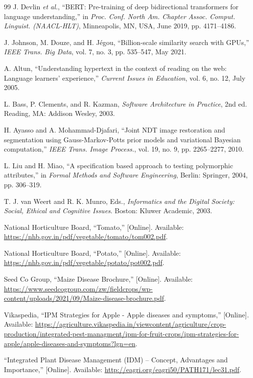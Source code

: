 \documentclass[12pt, a4paper]{report}
\begin{document}
\begin{thebibliography}{99}
J. Devlin \textit{et al.}, ``BERT: Pre-training of deep bidirectional transformers for language understanding,'' in \textit{Proc. Conf. North Am. Chapter Assoc. Comput. Linguist. (NAACL-HLT)}, Minneapolis, MN, USA, June 2019, pp. 4171--4186.

J. Johnson, M. Douze, and H. Jégou, ``Billion-scale similarity search with GPUs,'' \textit{IEEE Trans. Big Data}, vol. 7, no. 3, pp. 535--547, May 2021.

A. Altun, ``Understanding hypertext in the context of reading on the web: Language learners' experience,'' \textit{Current Issues in Education}, vol. 6, no. 12, July 2005.

L. Bass, P. Clements, and R. Kazman, \textit{Software Architecture in Practice}, 2nd ed. Reading, MA: Addison Wesley, 2003.

H. Ayasso and A. Mohammad-Djafari, ``Joint NDT image restoration and segmentation using Gauss-Markov-Potts prior models and variational Bayesian computation,'' \textit{IEEE Trans. Image Process.}, vol. 19, no. 9, pp. 2265--2277, 2010.

L. Liu and H. Miao, ``A specification based approach to testing polymorphic attributes,'' in \textit{Formal Methods and Software Engineering}, Berlin: Springer, 2004, pp. 306--319.

T. J. van Weert and R. K. Munro, Eds., \textit{Informatics and the Digital Society: Social, Ethical and Cognitive Issues}. Boston: Kluwer Academic, 2003.

National Horticulture Board, ``Tomato,'' [Online]. Available: \url{https://nhb.gov.in/pdf/vegetable/tomato/tom002.pdf}.

National Horticulture Board, ``Potato,'' [Online]. Available: \url{https://nhb.gov.in/pdf/vegetable/potato/pot002.pdf}.

Seed Co Group, ``Maize Disease Brochure,'' [Online]. Available: \url{https://www.seedcogroup.com/zw/fieldcrops/wp-content/uploads/2021/09/Maize-disease-brochure.pdf}.

Vikaspedia, ``IPM Strategies for Apple - Apple diseases and symptoms,'' [Online]. Available: \url{https://agriculture.vikaspedia.in/viewcontent/agriculture/crop-production/integrated-pest-managment/ipm-for-fruit-crops/ipm-strategies-for-apple/apple-diseases-and-symptoms?lgn=en}.

``Integrated Plant Disease Management (IDM) – Concept, Advantages and Importance,'' [Online]. Available: \url{http://eagri.org/eagri50/PATH171/lec31.pdf}.

\end{thebibliography}
\end{document}
